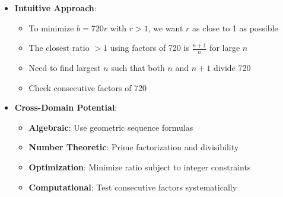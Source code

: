 \documentclass[11pt]{article}
\begin{document}
\begin{problemconfigbox}
\begin{itemize}[leftmargin=*]
    \item \textbf{Intuitive Approach}: 
    \begin{itemize}
        \item To minimize $b = 720r$ with $r > 1$, we want $r$ as close to 1 as possible
        \item The closest ratio $> 1$ using factors of 720 is $\frac{n+1}{n}$ for large $n$
        \item Need to find largest $n$ such that both $n$ and $n+1$ divide 720
        \item Check consecutive factors of 720
    \end{itemize}
    
    \item \textbf{Cross-Domain Potential}: 
    \begin{itemize}
        \item \textbf{Algebraic}: Use geometric sequence formulas
        \item \textbf{Number Theoretic}: Prime factorization and divisibility
        \item \textbf{Optimization}: Minimize ratio subject to integer constraints
        \item \textbf{Computational}: Test consecutive factors systematically
    \end{itemize}
\end{itemize}
\end{problemconfigbox}
\end{document}
